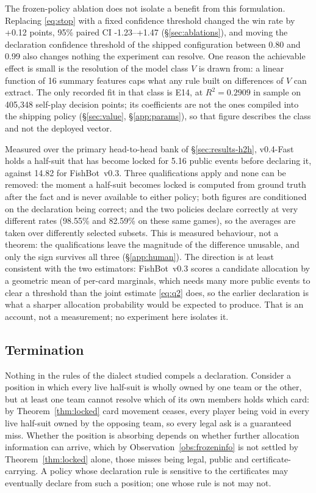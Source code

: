 \documentclass[11pt]{article}
\theoremstyle{definition}
\DeclareRobustCommand{\vfast}{\texorpdfstring{\mbox{v0.4-Fast}}{v0.4-Fast}}
\DeclareRobustCommand{\vthree}{\texorpdfstring{\mbox{FishBot v0.3}}{FishBot v0.3}}
\newcommand{\numVsVthreeDeclAcc}{98.55}
\newcommand{\numVthreeDeclAccSame}{82.59}
\newcommand{\numLockHoldFour}{5.16}
\newcommand{\numLockHoldThree}{14.82}
\newcommand{\numAblStop}{+0.12}
\newcommand{\numAblStopCI}{-1.23--+1.47}
\newcommand{\numValueRows}{405{,}348}
\newcommand{\numValueRSq}{0.2909}
\newcommand{\numValueFeats}{16}
\begin{document}
The frozen-policy ablation does not isolate a benefit from this formulation.
Replacing \eqref{eq:stop} with a fixed confidence threshold changed the win rate
by \numAblStop{} points, 95\% paired CI \numAblStopCI{} (\S\ref{sec:ablations}),
and moving the declaration confidence threshold of the shipped configuration
between 0.80 and 0.99 also changes nothing the experiment can resolve. One reason
the achievable effect is small is the resolution of the model class $V$ is drawn
from: a linear function of \numValueFeats{} summary features caps what any rule
built on differences of $V$ can extract. The only recorded fit in that class is
E14, at $R^2 = \numValueRSq$ in sample on \numValueRows{} self-play decision
points; its coefficients are not the ones compiled into the shipping policy
(\S\ref{sec:value}, \S\ref{app:params}), so that figure describes the class and
not the deployed vector.

Measured over the primary head-to-head bank of \S\ref{sec:results-h2h}, \vfast{}
holds a half-suit that has become locked for \numLockHoldFour{} public events
before declaring it, against \numLockHoldThree{} for \vthree{}. Three
qualifications apply and none can be removed: the moment a half-suit becomes
locked is computed from ground truth after the fact and is never available to
either policy; both figures are conditioned on the declaration being correct; and
the two policies declare correctly at very different rates
(\numVsVthreeDeclAcc{}\% and \numVthreeDeclAccSame{}\% on these same games), so
the averages are taken over differently selected subsets. This is measured
behaviour, not a theorem: the qualifications leave the magnitude of the
difference unusable, and only the sign survives all three
(\S\ref{app:human}). The direction is at least consistent with the two
estimators: \vthree{} scores a candidate allocation by a geometric mean of
per-card marginals, which needs many more public events to clear a threshold than
the joint estimate \eqref{eq:q2} does, so the earlier declaration is what a
sharper allocation probability would be expected to produce. That is an account,
not a measurement; no experiment here isolates it.

\subsection{Termination}
\label{sec:termination}

Nothing in the rules of the dialect studied compels a declaration. Consider a
position in which every live half-suit is wholly owned by one team or the other,
but at least one team cannot resolve which of its own members holds which card:
by Theorem~\ref{thm:locked} card movement ceases, every player being void in
every live half-suit owned by the opposing team, so every legal ask is a
guaranteed miss. Whether the position is absorbing depends on whether further
allocation information can arrive, which by Observation~\ref{obs:frozeninfo} is
not settled by Theorem~\ref{thm:locked} alone, those misses being legal, public
and certificate-carrying. A policy whose declaration rule is sensitive to the
certificates may eventually declare from such a position; one whose rule is not
may not.
\end{document}
